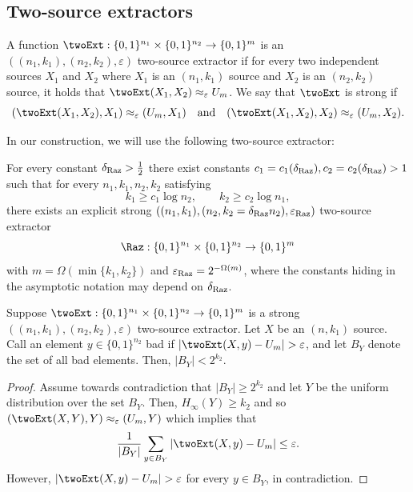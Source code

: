 \subsection*{Two-source extractors}
\begin{definition}
A function $\twoExt:\{0,1\}^{n_1}\times\{0,1\}^{n_2}\to\{0,1\}^m$ is an $((n_1,k_1),(n_2,k_2),\varepsilon)$ two-source extractor if for every two independent sources $X_1$ and $X_2$ where $X_1$ is an $(n_1,k_1)$ source and $X_2$ is an $(n_2,k_2)$ source, it holds that $\twoExt(X_1,X_2)\approx_\varepsilon U_m$. We say that $\twoExt$ is strong if
\[(\twoExt(X_1,X_2),X_1)\approx_\varepsilon(U_m,X_1)\quad\text{and}\quad(\twoExt(X_1,X_2),X_2)\approx_\varepsilon(U_m,X_2).\]
\end{definition}
In our construction, we will use the following two-source extractor:
\begin{theorem}[{[39]}]
For every constant $\delta_{\rm Raz}>\frac12$ there exist constants $c_1=c_1(\delta_{\rm Raz}),c_2=c_2(\delta_{\rm Raz})>1$ such that for every $n_1,k_1,n_2,k_2$ satisfying
\[k_1\ge c_1\log n_2,\qquad k_2\ge c_2\log n_1,\]
there exists an explicit strong $((n_1,k_1),(n_2,k_2=\delta_{\rm Raz}n_2),\varepsilon_{\rm Raz})$ two-source extractor
\[\Raz:\{0,1\}^{n_1}\times\{0,1\}^{n_2}\to\{0,1\}^m\]
with $m=\Omega(\min\{k_1,k_2\})$ and $\varepsilon_{\rm Raz}=2^{-\Omega(m)}$, where the constants hiding in the asymptotic notation may depend on $\delta_{\rm Raz}$.
\end{theorem}
\begin{claim}
Suppose $\twoExt:\{0,1\}^{n_1}\times\{0,1\}^{n_2}\to\{0,1\}^m$ is a strong $((n_1,k_1),(n_2,k_2),\varepsilon)$ two-source extractor. Let $X$ be an $(n,k_1)$ source. Call an element $y\in\{0,1\}^{n_2}$ bad if $|\twoExt(X,y)-U_m|>\varepsilon$, and let $B_Y$ denote the set of all bad elements. Then, $|B_Y|<2^{k_2}$.
\end{claim}
\begin{proof}
Assume towards contradiction that $|B_Y|\ge2^{k_2}$ and let $Y$ be the uniform distribution over the set $B_Y$. Then, $H_\infty(Y)\ge k_2$ and so $(\twoExt(X,Y),Y)\approx_\varepsilon(U_m,Y)$ which implies that
\[\frac1{|B_Y|}\sum_{y\in B_Y}|\twoExt(X,y)-U_m|\le\varepsilon.\]
However, $|\twoExt(X,y)-U_m|>\varepsilon$ for every $y\in B_Y$, in contradiction.
\end{proof}

